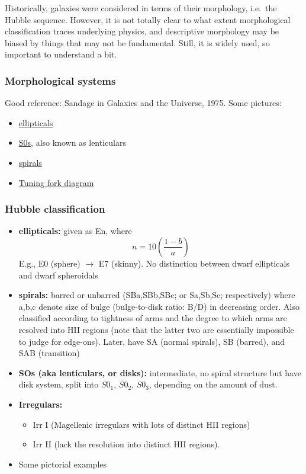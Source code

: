 \documentclass{article}
\begin{document}
Historically, galaxies were considered in terms of their morphology, i.e.\
the Hubble sequence. However, it is not totally clear to what extent
morphological classification traces underlying physics, and descriptive
morphology may be biased by things that may not be fundamental. Still, it
is widely used, so important to understand a bit.

\subsubsection{Morphological systems}
Good reference: Sandage in Galaxies and the Universe, 1975.
Some pictures:
\begin{itemize}
    \item \href{http://astronomy.nmsu.edu/holtz/a555/html/diagrams/a616/ellips.htm}
        {{ellipticals}}
    \item \href{http://astronomy.nmsu.edu/holtz/a555/html/diagrams/a616/s0.htm}
        {{S0s}}, also known as lenticulars
    \item \href{http://astronomy.nmsu.edu/holtz/a555/html/diagrams/a616/spirals.htm}
        {{spirals}}
    \item \href{http://people.virginia.edu/~dmw8f/astr5630/Topic02/t2_hubble_tfork.html}
        {{Tuning fork diagram}}
\end{itemize}

\subsubsection{Hubble classification}
\begin{itemize}
    \item \textbf{ellipticals:} given as En, where
        \[
            n = 10(\frac{1-b}{a})
        \]
        E.g., E0 (sphere) $\rightarrow$ E7 (skinny).
        No distinction between dwarf ellipticals and dwarf spheroidals
    \item \textbf{spirals:} barred or unbarred (SBa,SBb,SBc; or Sa,Sb,Sc;
        respectively)
        where a,b,c denote size of bulge (bulge-to-disk ratio: B/D)
        in decreasing order. Also classified according to tightness of
        arms and the degree to which arms are resolved into HII regions
        (note that the latter two are essentially impossible to judge
        for edge-ons).
        Later, have SA (normal spirals), SB (barred), and SAB (transition)
    \item \textbf{SOs (aka lenticulars, or disks):} intermediate, no spiral
        structure but have disk system, split into $S0_1$, $S0_2$, $S0_3$,
        depending on the amount of dust.
    \item \textbf{Irregulars:}
        \begin{itemize}
            \item Irr I (Magellenic irregulars with lots of distinct HII regions)
            \item Irr II (lack the resolution into distinct HII regions).
        \end{itemize}
    \item Some pictorial examples
\end{itemize}
\end{document}

